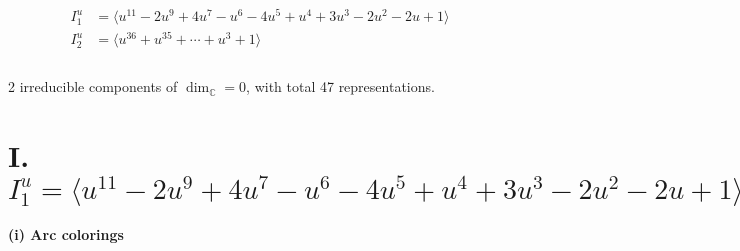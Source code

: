 \documentclass[1p]{elsarticle_modified}
\theoremstyle{definition}
\begin{document}
\begin{align*}
I^u_{1}&=\langle 
u^{11}-2 u^9+4 u^7- u^6-4 u^5+u^4+3 u^3-2 u^2-2 u+1\rangle \\
I^u_{2}&=\langle 
u^{36}+u^{35}+\cdots+u^3+1\rangle \\
\\
\end{align*}
\raggedright * 2 irreducible components of $\dim_{\mathbb{C}}=0$, with total 47 representations.\\
\newpage
\renewcommand{\arraystretch}{1}
\centering \section*{I. $I^u_{1}= \langle u^{11}-2 u^9+4 u^7- u^6-4 u^5+u^4+3 u^3-2 u^2-2 u+1 \rangle$}
\flushleft \textbf{(i) Arc colorings}\\
\end{document}
